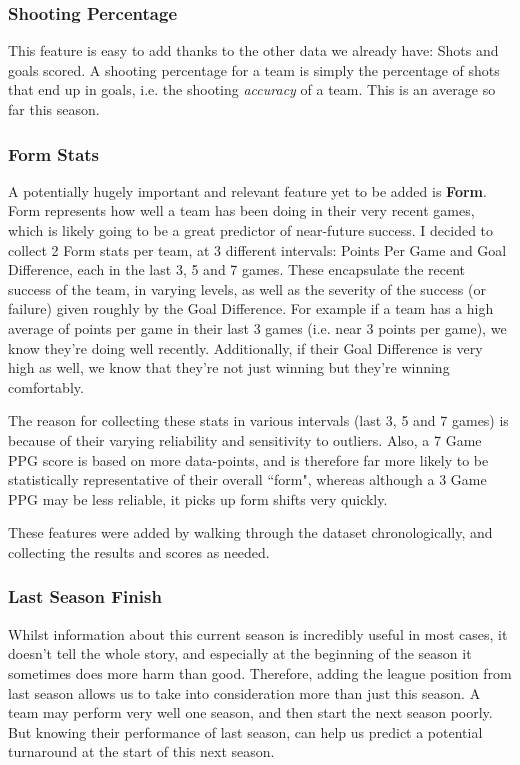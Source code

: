 \documentclass[12pt,a4paper,twoside,openright]{report}
\begin{document}
\subsubsection{Shooting Percentage}

This feature is easy to add thanks to the other data we already have: Shots and goals scored. A shooting percentage for a team is simply the percentage of shots that end up in goals, i.e. the shooting \textit{accuracy} of a team. This is an average so far this season.

\subsubsection{Form Stats}

A potentially hugely important and relevant feature yet to be added is \textbf{Form}. Form represents how well a team has been doing in their very recent games, which is likely going to be a great predictor of near-future success. I decided to collect 2 Form stats per team, at 3 different intervals: Points Per Game and Goal Difference, each in the last 3, 5 and 7 games. These encapsulate the recent success of the team, in varying levels, as well as the severity of the success (or failure) given roughly by the Goal Difference. For example if a team has a high average of points per game in their last 3 games (i.e. near 3 points per game), we know they're doing well recently. Additionally, if their Goal Difference is very high as well, we know that they're not just winning but they're winning comfortably.

The reason for collecting these stats in various intervals (last 3, 5 and 7 games) is because of their varying reliability and sensitivity to outliers. Also, a 7 Game PPG score is based on more data-points, and is therefore far more likely to be statistically representative of their overall ``form", whereas although a 3 Game PPG may be less reliable, it picks up form shifts very quickly.

These features were added by walking through the dataset chronologically, and collecting the results and scores as needed.

\subsubsection{Last Season Finish}

Whilst information about this current season is incredibly useful in most cases, it doesn't tell the whole story, and especially at the beginning of the season it sometimes does more harm than good. Therefore, adding the league position from last season allows us to take into consideration more than just this season. A team may perform very well one season, and then start the next season poorly. But knowing their performance of last season, can help us predict a potential turnaround at the start of this next season.
\end{document}
